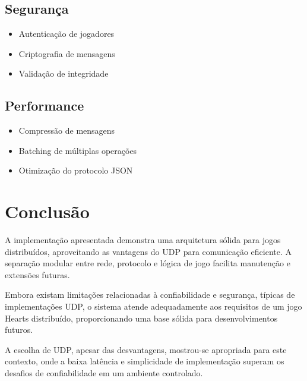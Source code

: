 \documentclass[12pt,a4paper]{article}
\begin{document}
\subsection{Segurança}
\begin{itemize}
    \item Autenticação de jogadores
    \item Criptografia de mensagens
    \item Validação de integridade
\end{itemize}

\subsection{Performance}
\begin{itemize}
    \item Compressão de mensagens
    \item Batching de múltiplas operações
    \item Otimização do protocolo JSON
\end{itemize}

\section{Conclusão}

A implementação apresentada demonstra uma arquitetura sólida para jogos distribuídos, aproveitando as vantagens do UDP para comunicação eficiente. A separação modular entre rede, protocolo e lógica de jogo facilita manutenção e extensões futuras.

Embora existam limitações relacionadas à confiabilidade e segurança, típicas de implementações UDP, o sistema atende adequadamente aos requisitos de um jogo Hearts distribuído, proporcionando uma base sólida para desenvolvimentos futuros.

A escolha de UDP, apesar das desvantagens, mostrou-se apropriada para este contexto, onde a baixa latência e simplicidade de implementação superam os desafios de confiabilidade em um ambiente controlado.
\end{document}
